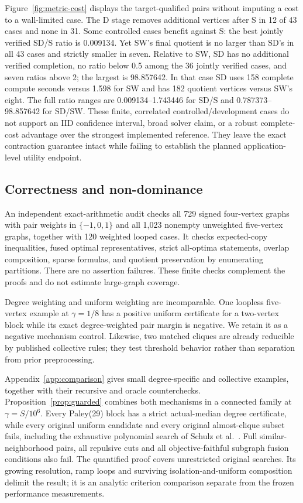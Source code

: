 \documentclass[sigconf,anonymous,review]{acmart}
\newcommand{\1}{\mathbf{1}}
\begin{document}
Figure~\ref{fig:metric-cost} displays the target-qualified pairs without
imputing a cost to a wall-limited case. The D stage removes additional vertices after S in 12 of 43 cases and none
in 31. Some controlled cases benefit against S: the best jointly verified
SD/S ratio is 0.009134. Yet SW's final quotient is no larger than SD's in
all 43 cases and strictly smaller in seven. Relative to SW, SD has no
additional verified completion, no ratio below 0.5 among the 36 jointly
verified cases, and seven ratios above 2; the largest is 98.857642. In that
case SD uses 158 complete compute seconds versus 1.598 for SW and has 182
quotient vertices versus SW's eight. The full ratio ranges are
0.009134--1.743446 for SD/S and 0.787373--98.857642 for SD/SW.
These finite, correlated controlled/development cases do not support an
IID confidence interval, broad solver claim, or a robust complete-cost
advantage over the strongest implemented reference. They leave the exact
contraction guarantee intact while failing to establish the planned
application-level utility endpoint.

\subsection{Correctness and non-dominance}
An independent exact-arithmetic audit checks all 729 signed four-vertex graphs
with pair weights in $\{-1,0,1\}$ and all 1,023 nonempty unweighted five-vertex
graphs, together with 120 weighted looped cases. It checks expected-copy
inequalities, fused optimal representatives, strict all-optima statements,
overlap composition, sparse formulas, and quotient preservation by enumerating
partitions. There are no assertion failures. These finite checks complement
the proofs and do not estimate large-graph coverage.

Degree weighting and uniform weighting are incomparable. One loopless
five-vertex example at $\gamma=1/8$ has a positive uniform certificate for a
two-vertex block while its exact degree-weighted pair margin is negative.
We retain it as a negative mechanism control. Likewise, two matched cliques
are already reducible by published collective rules; they test threshold
behavior rather than separation from prior preprocessing.

Appendix~\ref{app:comparison} gives small degree-specific and collective
examples, together with their recursive and oracle counterchecks.
Proposition~\ref{prop:guarded} combines both mechanisms in a connected family
at $\gamma=S/10^6$. Every Paley(29) block has a strict actual-median degree
certificate, while every original uniform candidate and every original
almost-clique subset fails, including the exhaustive polynomial search of
Schulz et al.~\cite{schulz2022cut}. Full similar-neighborhood pairs,
all repulsive cuts and all objective-faithful subgraph fusion conditions
also fail. The quantified proof covers unrestricted original searches.
Its growing resolution, ramp loops and surviving isolation-and-uniform
composition delimit the result; it is an analytic criterion comparison
separate from the frozen performance measurements.
\end{document}

